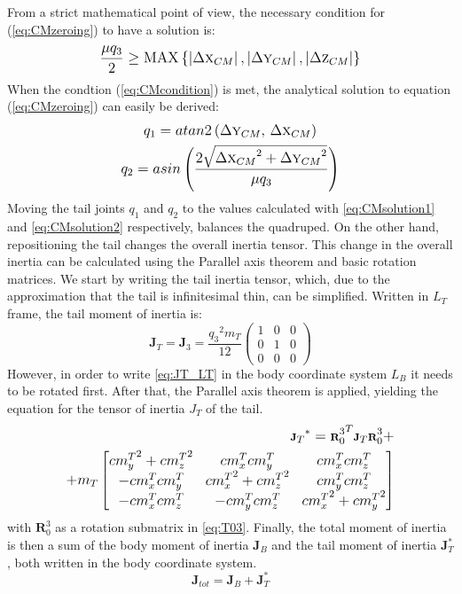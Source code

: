 From a strict mathematical point of view, the necessary condition for (\ref{eq:CMzeroing}) to have a solution is:
\begin{equation}\label{eq:CMcondition}
\frac{\mu q_3}{2}\geq \textup{MAX}\left \{ \left | \Delta \textsc{x}_{CM} \right |, \left | \Delta \textsc{y}_{CM} \right |,\left | \Delta \textsc{z}_{CM} \right |\right \}
\end{equation}
When the condtion (\ref{eq:CMcondition}) is met, the analytical solution to equation (\ref{eq:CMzeroing}) can easily be derived:
\begin{gather}\label{eq:CMsolution1}
q_1=atan2\left({\Delta \textsc{y}_{CM}},\, {\Delta \textsc{x}_{CM}}\right)\\
q_2=asin\left(\frac{2\sqrt{{\Delta \textsc{x}_{CM}}^2+{\Delta \textsc{y}_{CM}}^2}}{\mu q_3} \right)\label{eq:CMsolution2}
\end{gather}
Moving the tail joints $q_1$ and $q_2$ to the values calculated with \eqref{eq:CMsolution1} and \eqref{eq:CMsolution2} respectively, balances the quadruped. On the other hand, repositioning the tail changes the overall inertia tensor. This change in the overall inertia can be calculated using the Parallel axis theorem and basic rotation matrices. We start by writing the tail inertia tensor, which, due to the approximation that the tail is infinitesimal thin, can be simplified. Written in $L_T$ frame, the tail moment of inertia is:
\begin{equation}\label{eq:JT_LT}
\textbf{J}_T=\textbf{J}_3=\frac{{q_3}^2 m_T}{12}\left(
\begin{array}{ccc}
 1 & 0 & 0 \\
 0 & 1 & 0 \\
 0 & 0 & 0
\end{array}
\right)
\end{equation}
However, in order to write \eqref{eq:JT_LT} in the body coordinate system $L_B$ it needs to be rotated first. After that, the Parallel axis theorem is applied, yielding the equation for the tensor of inertia $J_T$ of the tail. 
\begin{equation}
\begin{aligned}
\scriptsize
{\textbf{J}_T}^*={\textbf{R}_0^3}^T\textbf{J}_T\textbf{R}_0^3+\\+m_T\begin{bmatrix}
{cm_y^T}^2 +{cm_z^T}^2& {cm_x^T}{cm_y^T}& {cm_x^T}{cm_z^T} \\ 
-{cm_x^T}{cm_y^T} & {cm_x^T}^2+{cm_z^T}^2 & {cm_y^T}{cm_z^T}\\ 
-{cm_x^T}{cm_z^T} & -{cm_y^T}{cm_z^T} & {cm_x^T}^2+{cm_y^T}^2
\end{bmatrix}
\normalsize
\end{aligned}
\end{equation}
with $\textbf{R}_0^3$ as a rotation submatrix in \eqref{eq:T03}. Finally, the total moment of inertia is then a sum of the body moment of inertia $\textbf{J}_B$ and the tail moment of inertia $\textbf{J}_T^*$, both written in the body coordinate system.
\begin{equation*}
\textbf{J}_{tot}=\textbf{J}_B+\textbf{J}_T^*
\end{equation*}
